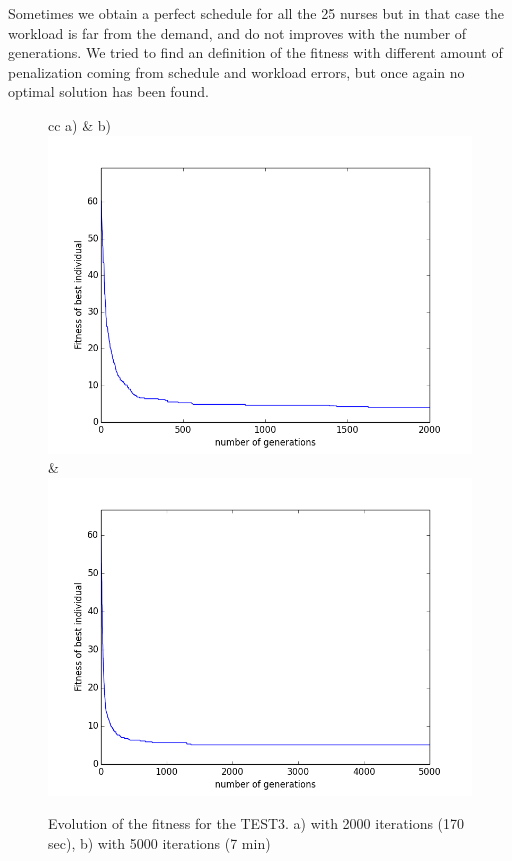 \documentclass[11pt]{article}
\begin{document}
Sometimes we obtain a perfect schedule for all the 25 nurses but in that case the workload is far from the demand, and do not improves with the number of generations. We tried to find an definition of the fitness  with different amount of penalization coming from schedule and workload errors, but once again no optimal solution has been found.
\begin{figure}[htbp]
\begin{center}
\begin{tabular}{cc}
a) & b) \cr
\includegraphics[scale=0.35]{./figure_BRKGA_TEST3} &
\includegraphics[scale=0.35]{./figure_BRKGA_5000} 
\end{tabular}
\end{center}
\caption{ Evolution of the fitness for the TEST3.  a) with 2000 iterations (170 sec),  b) with 5000 iterations (7 min)}
\label{figBRKGA_TEST3A}
\end{figure}
\end{document}
